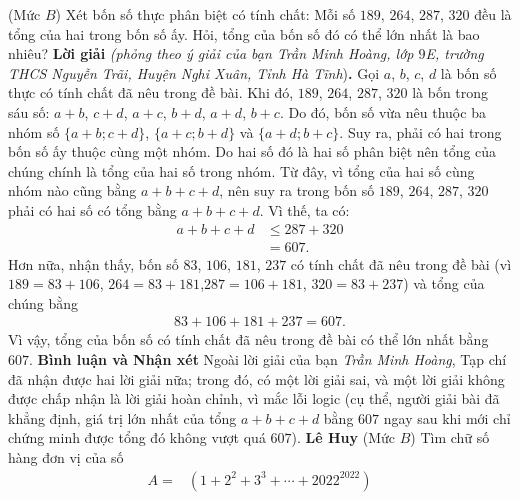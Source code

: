 \begin{multicols}{2}
	\setlength{\abovedisplayskip}{4pt}
	\setlength{\belowdisplayskip}{4pt}
	{}
	(Mức $B$) Xét bốn số thực phân biệt có tính chất: Mỗi số $189$, $264$, $287$, $320$ đều là tổng của hai trong bốn số ấy. Hỏi, tổng của bốn số đó có thể lớn nhất là bao nhiêu?
	\vskip 0.05cm
	\textbf{\color{thachthuctoanhoc}Lời giải} \textit{(phỏng theo ý giải của bạn Trần Minh Hoàng, lớp $9$E, trường THCS Nguyễn Trãi, Huyện Nghi Xuân, Tỉnh Hà Tĩnh})\textbf{\color{thachthuctoanhoc}.}
	\vskip 0.05cm
	Gọi $a$, $b$, $c$, $d$ là bốn số thực có tính chất đã nêu trong đề bài.
	\vskip 0.05cm
	Khi đó, $189$, $264$, $287$, $320$ là bốn trong sáu số: $a + b$, $c + d$, $a + c$, $b + d$, $a + d$, $b + c$. Do đó, bốn số vừa nêu thuộc ba nhóm số $\{a \!+\! b; c \!+\! d\}$, $\{a \!+\! c; b \!+\! d\}$ và $\{a \!+\! d; b \!+\! c\}$. Suy ra, phải có hai trong bốn số ấy thuộc cùng một nhóm. Do hai số đó là hai số phân biệt nên tổng của chúng chính là tổng của hai số trong nhóm. Từ đây, vì tổng của hai số cùng nhóm nào cũng bằng $a + b + c + d$, nên suy ra trong bốn số $189$, $264$, $287$, $320$ phải có hai số có tổng bằng $a + b + c + d$. Vì thế, ta có:
	\begin{align*}
		a + b + c + d &\le 287 + 320\\
		 &= 607.
	\end{align*}
	Hơn nữa, nhận thấy, bốn số $83$, $106$, $181$, $237$ có tính chất đã nêu trong đề bài (vì $189 = 83 + 106$, $264 = 83 + 181$,\linebreak $287 = 106 + 181$, $320 = 83 + 237$) và tổng của chúng bằng
	\begin{align*}
		83 + 106 + 181 + 237 = 607.
	\end{align*}
	Vì vậy, tổng của bốn số có tính chất đã nêu trong đề bài có thể lớn nhất bằng $607$.
	\vskip 0.05cm
	\textbf{\color{thachthuctoanhoc}Bình luận và Nhận xét}
	\vskip 0.05cm
	Ngoài lời giải của bạn \textit{Trần Minh Hoàng}, Tạp chí đã nhận được hai lời giải nữa; trong đó, có một lời giải sai, và một lời giải không được chấp nhận là lời giải hoàn chỉnh, vì mắc lỗi logic (cụ thể, người giải bài đã khẳng định, giá trị lớn nhất của tổng $a + b + c + d$ bằng $607$ ngay sau khi mới chỉ chứng minh được tổng đó không vượt quá $607$).
	\vskip 0.05cm
	\hfill	\textbf{\color{thachthuctoanhoc}Lê Huy}
	\vskip 0.05cm
	{}
	(Mức $B$) Tìm chữ số hàng đơn vị của số
	\begin{align*}
		A = &\left( {1 + {2^2} + {3^3} +  \cdots  + {{2022}^{2022}}} \right)\\

\end{align*}
\end{multicols}
